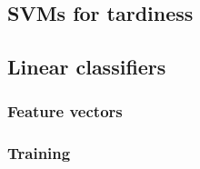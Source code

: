 \documentclass[11pt]{article} %
\begin{document}
\subsection{SVMs for tardiness}
\label{sec:svms_tardiness}
  
% 
%  
% 
% 
% 
% 

\subsection{Linear classifiers}
\label{sec:lcs}
% 

\subsubsection{Feature vectors}
\label{sec:feature_vecs}
% 
% 
% 
%  
% 
% 
% 

\subsubsection{Training}
\label{sec:training}
% 
\end{document}
